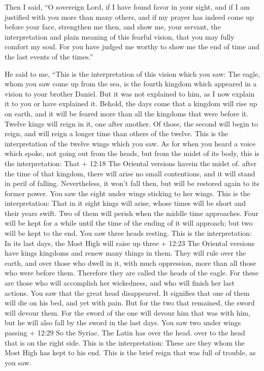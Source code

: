  Then I said, ``O sovereign Lord, if I have found favor in
your sight, and if I am justified with you more than many others, and if
my prayer has indeed come up before your face,  strengthen
me then, and show me, your servant, the interpretation and plain meaning
of this fearful vision, that you may fully comfort my soul. 
For you have judged me worthy to show me the end of time and the last
events of the times.''

 He said to me, ``This is the interpretation of this vision
which you saw:  The eagle, whom you saw come up from the
sea, is the fourth kingdom which appeared in a vision to your brother
Daniel.  But it was not explained to him, as I now explain
it to you or have explained it.  Behold, the days come that
a kingdom will rise up on earth, and it will be feared more than all the
kingdoms that were before it.  Twelve kings will reign in
it, one after another.  Of those, the second will begin to
reign, and will reign a longer time than others of the twelve.
 This is the interpretation of the twelve wings which you
saw.  As for when you heard a voice which spoke, not going
out from the heads, but from the midst of its body, this is the
interpretation:  That + 12:18 The Oriental versions havein
the midst of. after the time of that kingdom, there will arise no small
contentions, and it will stand in peril of falling. Nevertheless, it
won't fall then, but will be restored again to its former power.
 You saw the eight under wings sticking to her wings. This
is the interpretation:  That in it eight kings will arise,
whose times will be short and their years swift.  Two of
them will perish when the middle time approaches. Four will be kept for
a while until the time of the ending of it will approach; but two will
be kept to the end.  You saw three heads resting. This is
the interpretation:  In its last days, the Most High will
raise up three + 12:23 The Oriental versions have kings kingdoms and
renew many things in them. They will rule over the earth, 
and over those who dwell in it, with much oppression, more than all
those who were before them. Therefore they are called the heads of the
eagle.  For these are those who will accomplish her
wickedness, and who will finish her last actions.  You saw
that the great head disappeared. It signifies that one of them will die
on his bed, and yet with pain.  But for the two that
remained, the sword will devour them.  For the sword of the
one will devour him that was with him, but he will also fall by the
sword in the last days.  You saw two under wings passing +
12:29 So the Syriac. The Latin has over the head. over to the head that
is on the right side.  This is the interpretation: These
are they whom the Most High has kept to his end. This is the brief reign
that was full of trouble, as you saw.

